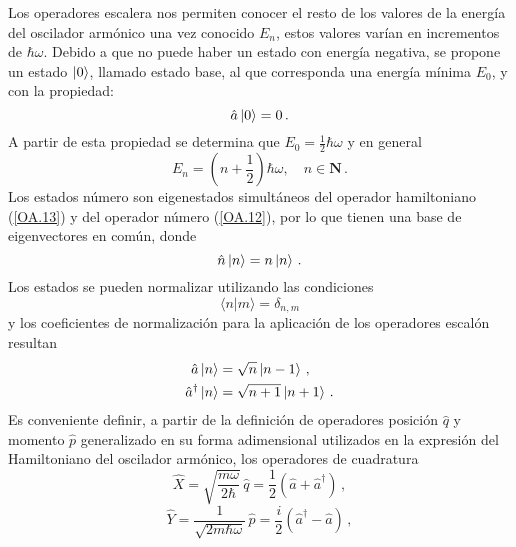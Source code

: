 Los operadores escalera nos permiten conocer el resto de los valores de la energía del oscilador armónico una vez conocido $E_n$, estos valores varían en incrementos de $\hbar\omega$. Debido a que no puede haber un estado con energía negativa, se propone un estado $\ket{0}$, llamado estado base, al que corresponda una energía mínima $E_0$, y con la propiedad:
\begin{equation}
  \label{OA.17}
  \hat{a}\ket{0} = 0\,.
\end{equation}
A partir de esta propiedad se determina que $E_0 = \frac{1}{2}\hbar\omega$ y en general
\begin{equation}
  \label{OA.18}
  E_n = \left( n + \frac{1}{2} \right) \hbar\omega, \quad n\in\mathbf{N}\,.
\end{equation}
Los estados número son eigenestados simultáneos del operador hamiltoniano (\ref{OA.13}) y del operador número (\ref{OA.12}), por lo que tienen una base de eigenvectores en común, donde
\begin{equation}
  \label{OA.19}
  \hat{n}\ket{n} = n\ket{n}\,.
\end{equation}
Los estados se pueden normalizar utilizando las condiciones
\begin{equation}
  \label{OA.20}
  \langle n\vert m\rangle = \delta_{n,m}
\end{equation}
y los coeficientes de normalización para la aplicación de los operadores escalón resultan
\begin{align}
  \hat{a}\ket{n}           & = \sqrt{n} \ket{n-1} \,,\label{OA.21}   \\
  \hat{a}^{\dagger}\ket{n} & = \sqrt{n+1} \ket{n+1} \,.\label{OA.22}
\end{align}
Es conveniente definir, a partir de la definición de operadores posición $\hat{q}$ y momento $\hat{p}$ generalizado en su forma adimensional utilizados en la expresión del Hamiltoniano del oscilador armónico, los operadores de cuadratura \cite{Loudon}
\begin{equation}
  \label{OA.23}
  \hat{X} = \sqrt{\frac{m\omega}{2\hbar}} \, \hat{q} = \frac{1}{2}\left( \hat{a} + \hat{a}^{\dagger} \right)\,,
\end{equation}
\begin{equation}
  \label{OA.24}
  \hat{Y} = \frac{1}{\sqrt{2m\hbar\omega}} \, \hat{p} = \frac{i}{2}\left( \hat{a}^{\dagger} - \hat{a} \right)\,,
\end{equation}
